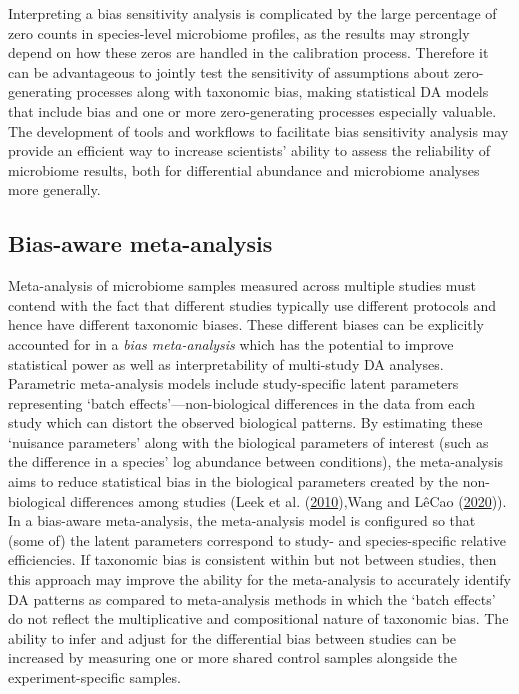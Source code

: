\documentclass[
]{article}
\begin{document}
Interpreting a bias sensitivity analysis is complicated by the large percentage of zero counts in species-level microbiome profiles, as the results may strongly depend on how these zeros are handled in the calibration process.
Therefore it can be advantageous to jointly test the sensitivity of assumptions about zero-generating processes along with taxonomic bias, making statistical DA models that include bias and one or more zero-generating processes especially valuable.
The development of tools and workflows to facilitate bias sensitivity analysis may provide an efficient way to increase scientists' ability to assess the reliability of microbiome results, both for differential abundance and microbiome analyses more generally.

\hypertarget{bias-aware-meta-analysis}{%
\subsection{Bias-aware meta-analysis}\label{bias-aware-meta-analysis}}

Meta-analysis of microbiome samples measured across multiple studies must contend with the fact that different studies typically use different protocols and hence have different taxonomic biases.
These different biases can be explicitly accounted for in a \emph{bias meta-analysis} which has the potential to improve statistical power as well as interpretability of multi-study DA analyses.
Parametric meta-analysis models include study-specific latent parameters representing `batch effects'---non-biological differences in the data from each study which can distort the observed biological patterns.
By estimating these `nuisance parameters' along with the biological parameters of interest (such as the difference in a species' log abundance between conditions), the meta-analysis aims to reduce statistical bias in the biological parameters created by the non-biological differences among studies (Leek et al. (\protect\hyperlink{ref-leek2010tack}{2010}),Wang and LêCao (\protect\hyperlink{ref-wang2019mana}{2020})).
In a bias-aware meta-analysis, the meta-analysis model is configured so that (some of) the latent parameters correspond to study- and species-specific relative efficiencies.
If taxonomic bias is consistent within but not between studies, then this approach may improve the ability for the meta-analysis to accurately identify DA patterns as compared to meta-analysis methods in which the `batch effects' do not reflect the multiplicative and compositional nature of taxonomic bias.
The ability to infer and adjust for the differential bias between studies can be increased by measuring one or more shared control samples alongside the experiment-specific samples.
\end{document}
